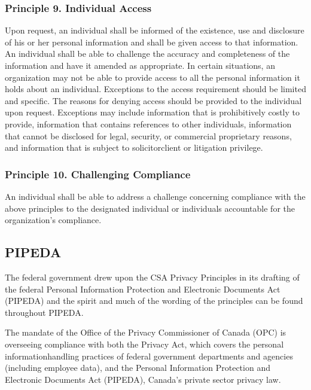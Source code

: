 \documentclass[letterpaper,10pt,english]{sphinxmanual}
\begin{document}
\subsubsection{Principle 9. Individual Access}
\label{\detokenize{2_compliance:principle-9-individual-access}}
\sphinxAtStartPar
Upon request, an individual shall be informed of the existence, use and disclosure of his or
her personal information and shall be given access to that information. An individual shall be
able to challenge the accuracy and completeness of the information and have it amended as
appropriate. In certain situations, an organization may not be able to provide access to all the
personal information it holds about an individual. Exceptions to the access requirement
should be limited and specific. The reasons for denying access should be provided to the
individual upon request. Exceptions may include information that is prohibitively costly to
provide, information that contains references to other individuals, information that cannot be
disclosed for legal, security, or commercial proprietary reasons, and information that is
subject to solicitor\sphinxhyphen{}client or litigation privilege.


\subsubsection{Principle 10. Challenging Compliance}
\label{\detokenize{2_compliance:principle-10-challenging-compliance}}
\sphinxAtStartPar
An individual shall be able to address a challenge concerning compliance with the above
principles to the designated individual or individuals accountable for the organization’s
compliance.


\subsection{PIPEDA}
\label{\detokenize{2_compliance:pipeda}}
\sphinxAtStartPar
The federal government drew upon the CSA Privacy Principles in its drafting of the federal
Personal Information Protection and Electronic Documents Act (PIPEDA) and the spirit and
much of the wording of the principles can be found throughout PIPEDA.

\sphinxAtStartPar
The mandate of the Office of the Privacy Commissioner of Canada (OPC) is overseeing
compliance with both the Privacy Act, which covers the personal information\sphinxhyphen{}handling
practices of federal government departments and agencies (including employee data), and the
Personal Information Protection and Electronic Documents Act (PIPEDA), Canada’s private
sector privacy law.
\end{document}

